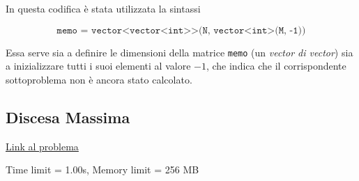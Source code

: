 In questa codifica è stata utilizzata la sintassi 

\begin{equation*}
	\texttt{memo = vector<vector<int>>(N, vector<int>(M, -1))}
\end{equation*}

Essa serve sia a definire le dimensioni della matrice \texttt{memo} (un \textit{vector di vector}) sia a inizializzare tutti i suoi elementi al valore $-1$, che indica che il corrispondente sottoproblema non è ancora stato calcolato.



\subsection{Discesa Massima}
\href{https://training.olinfo.it/task/discesa}{Link al problema} 

\smallskip

\noindent Time limit = 1.00s, Memory limit = 256 MB



